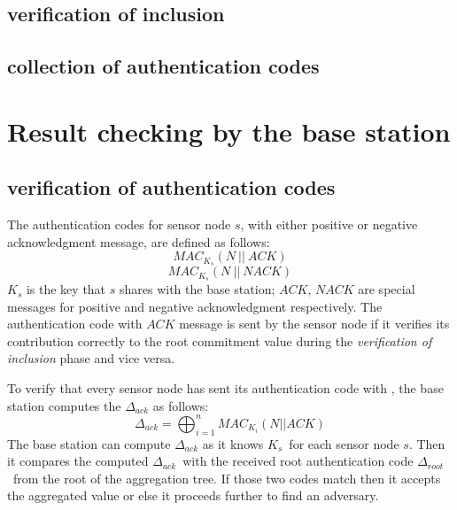 	\subsection{verification of inclusion}
	\subsection{collection of authentication codes}

\section{Result checking by the base station}
	\subsection{verification of authentication codes}
		\label{sec:verficiation-of-authentication-codes}
		The authentication codes for sensor node $s$, with either positive or negative acknowledgment message, are defined as follows:
		\begin{equation}
			MAC_{K_{s}}(N\ ||\ \textit{ACK})
		\end{equation}
		\begin{equation}
			MAC_{K_{s}}(N\ ||\ \textit{NACK})
		\end{equation}
		$K_{s}$ is the key that $s$ shares with the base station;
		$\textit{ACK}$, $\textit{NACK}$ are special messages for positive and negative acknowledgment respectively.
		The authentication code with $\textit{ACK}$ message is sent by the sensor node if it verifies its contribution correctly to the root commitment value during the 
		\textit{verification of inclusion} phase and vice versa.
		
		To verify that every sensor node has sent its authentication code with \ack, the base station computes the $\Delta_{ack}$ as follows:
		\begin{equation}
			\displaystyle{\Delta_{ack} = \bigoplus_{i = 1}^n MAC_{K_{i}}(N || ACK) }
		\end{equation}
		The base station can compute $\Delta_{ack}$ as it knows $K_{s}$\ for each sensor node $s$.
		Then it compares the computed $\Delta_{ack}$\ with the received root authentication code $\Delta_{root}$\ from the root of the aggregation tree. 
		If those two codes match then it accepts the aggregated value or else it proceeds further to find an adversary. 

